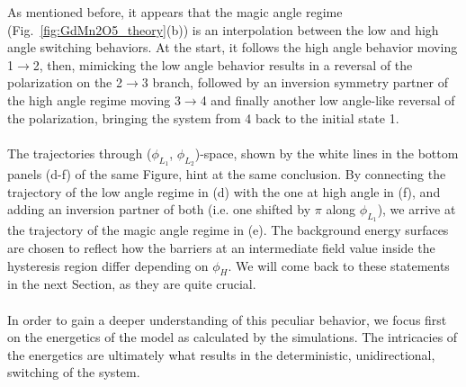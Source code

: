 As mentioned before, it appears that the magic angle regime (Fig.~\ref{fig:GdMn2O5_theory}(b)) is an interpolation between the low and high angle switching behaviors.
At the start, it follows the high angle behavior moving 1$\rightarrow$2, then, mimicking the low angle behavior results in a reversal of the polarization on the 2$\rightarrow$3 branch, followed by an inversion symmetry partner of the high angle regime moving 3$\rightarrow$4 and finally another low angle-like reversal of the polarization, bringing the system from 4 back to the initial state 1. 
\\\\
The trajectories through ($\phi_{L_1}$, $\phi_{L_2}$)-space, shown by the white lines in the bottom panels (d-f) of the same Figure, hint at the same conclusion.
By connecting the trajectory of the low angle regime in (d) with the one at high angle in (f), and adding an inversion partner of both (i.e. one shifted by $\pi$ along $\phi_{L_1}$), we arrive at the trajectory of the magic angle regime in (e).
The background energy surfaces are chosen to reflect how the barriers at an intermediate field value inside the hysteresis region differ depending on $\phi_H$.
We will come back to these statements in the next Section, as they are quite crucial.
\\\\
In order to gain a deeper understanding of this peculiar behavior, we focus first on the energetics of the model as calculated by the simulations.
The intricacies of the energetics are ultimately what results in the deterministic, unidirectional, switching of the system.

